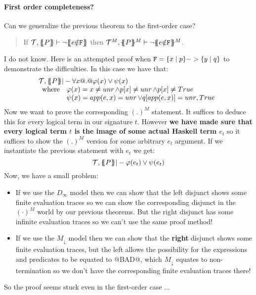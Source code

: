 \documentclass[preprint]{sigplanconf}
\begin{document}
\paragraph{First order completeness?} Can we generalize the previous theorem to the first-order case?
\begin{quote}
If $\Th, \ptrans{}{P} \vdash \neg \ctrans{}{}{e{\notin}\Ft}$ then
$\Th^M, \ptrans{}{P}^M \vdash \neg \ctrans{}{}{e{\notin}\Ft}^M$.
\end{quote}
I do not know. Here is an attempted proof when ${ \tt F} = \{ x \mid p \} -> \{ y \mid q \}$ 
to demonstrate the difficulties. In this case we have that:
\[\begin{array}{l}
     {\cal T},\{\!\!\{P\}\!\!\} |- \forall x @.@  \varphi(x) \lor \psi(x)  \\ 
     \begin{array}{ll}
       \mbox{where} & \varphi(x) = x \neq \mathop{unr} \land p[x] \neq \mathop{unr} \land p[x] \neq True \\
                    & \psi(x) = app(e,x) = \mathop{unr} \lor q[app(e,x)] = \mathop{unr},True
     \end{array}
\end{array}\]
Now we want to prove the corresponding $(.)^M$ statement. It suffices to deduce this for every logical term
in our signature $t$. However {\bf we have made sure that every logical term $t$ is the image of some actual Haskell term $e_t$} so it suffices to show
the $(.)^M$ version for some arbitrary $e_t$ argument. If we instantiate the previous statement with $e_t$ we get:
\[ {\cal T},\{\!\!\{P\}\!\!\} |- \varphi(e_t) \lor \psi(e_t) \]
Now, we have a small problem:
\begin{itemize}
   \item If we use the $D_{\infty}$ model then we can show that the left disjunct shows some finite evaluation traces so we can show the corresponding
         disjunct in the $(\cdot)^M$ world by our previous theorems. But the right disjunct has some infinite evaluation traces so we can't use the same proof method!
   \item If we use the $M_{\downarrow}$ model then we can show that the {\bf right} disjunct shows some finite evaluation traces, but the left allows the possibility
         for the expressions and predicates to be equated to @BAD@, which $M_{\downarrow}$ equates to non-termination so we don't have the corresponding finite evaluation
         traces there!
\end{itemize}
So the proof seems stuck even in the first-order case ...
\end{document}
